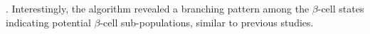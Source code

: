 \textbf{\cite{xin_pseudotime_2018}}.  Interestingly, the algorithm revealed a branching pattern among the $\beta$-cell states indicating potential $\beta$-cell sub-populations, similar to previous studies.\\




